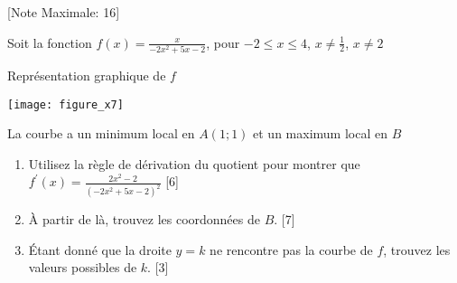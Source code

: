 \begin{question}
  \hspace*{\fill} [Note Maximale: 16]\par
  \medskip
  \noindent Soit la fonction $f(x) =\frac{x}{-2x^2 + 5x - 2}$, pour $-2 \le x \le 4$, $x \ne \frac{1}{2}$, $x\ne2$\par
  \medskip
  \begin{center} %
    \noindent Représentation graphique de $f$\par
    \texttt{[image: figure\_x7]}\par
    \noindent La courbe a un minimum local en $A(1;1)$ et un maximum local en $B$\par
  \end{center} %
  \begin{enumerate}[label=(\alph*)]
    \item Utilisez la règle de dérivation du quotient pour montrer que $f^\prime(x)=\frac{2x^2 - 2}{(-2x^2+5x-2)^2}$\hspace*{\fill} [6]
    \item À partir de là, trouvez les coordonnées de $B$.\hspace*{\fill} [7]
    \item Étant donné que la droite $y=k$ ne rencontre pas la courbe de $f$, trouvez les valeurs possibles de $k$.\hspace*{\fill} [3]
  \end{enumerate}
\end{question}

